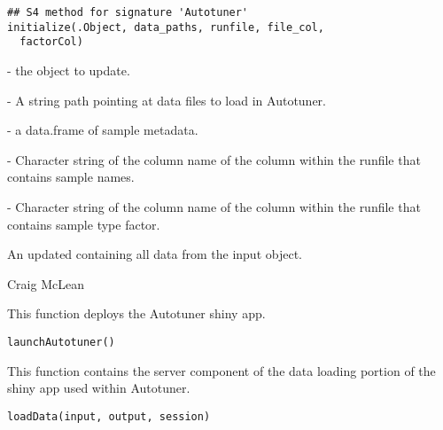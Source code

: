 \documentclass[a4paper]{book}
\begin{document}
%
\begin{Usage}
\begin{verbatim}
## S4 method for signature 'Autotuner'
initialize(.Object, data_paths, runfile, file_col,
  factorCol)
\end{verbatim}
\end{Usage}
%
\begin{Arguments}
\begin{ldescription}
\item[\code{.Object}] - the  object to update.

\item[\code{data\_paths}] - A string path pointing at data files to load in Autotuner.

\item[\code{runfile}] - a data.frame of sample metadata.

\item[\code{file\_col}] - Character string of the column name of the column within
the runfile that contains sample names.

\item[\code{factorCol}] - Character string of the column name of the column within
the runfile that contains sample type factor.
\end{ldescription}
\end{Arguments}
%
\begin{Value}
An updated  containing all data from
the input object.
\end{Value}
%
\begin{Author}\relax
Craig McLean
\end{Author}
%
\begin{Description}\relax
This function deploys the Autotuner shiny app.
\end{Description}
%
\begin{Usage}
\begin{verbatim}
launchAutotuner()
\end{verbatim}
\end{Usage}
%
\begin{Description}\relax
This function contains the server component of the data loading
portion of the shiny app used within Autotuner.
\end{Description}
%
\begin{Usage}
\begin{verbatim}
loadData(input, output, session)
\end{verbatim}
\end{Usage}
\end{document}
